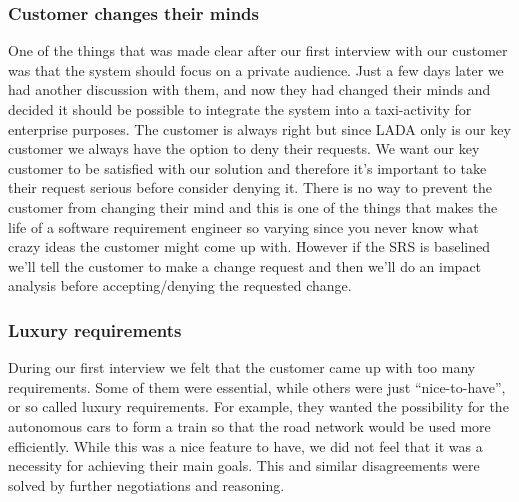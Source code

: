 \documentclass[10pt]{article}
\begin{document}
\subsubsection{Customer changes their minds}
One of the things that was made clear after our first interview with our customer was that the system should focus on a private audience. Just a few days later we had another discussion with them, and now they had changed their minds and decided it should be possible to integrate the system into a taxi-activity for enterprise purposes. The customer is always right but since LADA only is our key customer we always have the option to deny their requests. We want our key customer to be satisfied with our solution and therefore it's important to take their request serious before consider denying it. There is no way to prevent the customer from changing their mind and this is one of the things that makes the life of a software requirement engineer so varying since you never know what crazy ideas the customer might come up with. However if the SRS is baselined we'll tell the customer to make a change request and then we'll do an impact analysis before accepting/denying the requested change.

\subsubsection{Luxury requirements}
During our first interview we felt that the customer came up with too many requirements. Some of them were essential, while others were just “nice-to-have”, or so called luxury requirements. For example, they wanted the possibility for the autonomous cars to form a train so that the road network would be used more efficiently. While this was a nice feature to have, we did not feel that it was a necessity for achieving their main goals. This and similar disagreements were solved by further negotiations and reasoning. 
\end{document}
